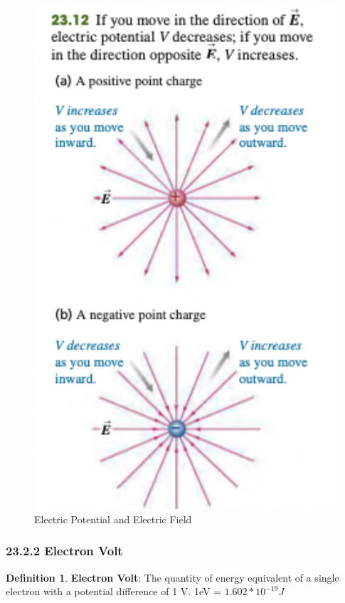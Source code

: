 \documentclass[12pt]{amsart}
\theoremstyle{definition}
\newtheorem{definition}{Definition} %
\numberwithin{equation}{theorem}    %
\begin{document}
\begin{figure}[H]
    \centering
    \includegraphics[width=5in]{Media/ElectricPotential.png}
    \caption{Electric Potential and Electric Field}
    \label{Electric Potential and Electric Field}
\end{figure}

\subsubsection*{23.2.2 Electron Volt}

\begin{definition}
    \textbf{Electron Volt}:
    The quantity of energy equivalent of a single electron with a potential difference
    of 1 V. 1eV = $1.602 * 10^{-19} J$
\end{definition}
\end{document}
